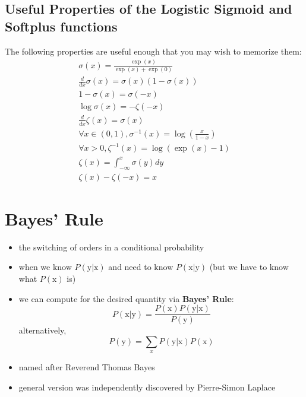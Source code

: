 \documentclass[11pt, twocolumn]{report}
\begin{document}
\subsection{Useful Properties of the Logistic Sigmoid and Softplus functions}
The following properties are useful enough that you may wish to memorize them:
\begin{align}
  \sigma(x) = \frac{\exp(x)}{\exp(x) + \exp(0)} \\
  \frac{d}{dx} \sigma(x) = \sigma(x)(1 - \sigma(x)) \\
  1 - \sigma(x) = \sigma(-x) \\
  \log \sigma(x) = -\zeta(-x) \\
  \frac{d}{dx} \zeta(x) = \sigma(x) \\
  \forall x \in (0, 1), \sigma^{-1}(x) = \log \left( \frac{x}{1 - x} \right) \\
  \forall x > 0, \zeta^{-1}(x) = \log(\exp(x) - 1) \\
  \zeta(x) = \int_{-\infty}^x \sigma(y)dy \\
  \zeta(x) - \zeta(-x) = x
\end{align}

\section{Bayes' Rule}
\begin{itemize}
  \item the switching of orders in a conditional probability
  \item when we know $P(\text{y} | \text{x})$ and need to know $P(\text{x} |
    \text{y})$ (but we have to know what $P(\text{x})$ is)
  \item we can compute for the desired quantity via \textbf{Bayes' Rule}:
    \begin{equation}
      P(\text{x} | \text{y}) = \frac{P(\text{x})P(\text{y} |
        \text{x})}{P(\text{y})}
    \end{equation}
    alternatively,
    \begin{equation}
      P(\text{y}) = \sum_x P(\text{y}|\text{x})P(\text{x})
    \end{equation}
  \item named after Reverend Thomas Bayes
  \item general version was independently discovered by Pierre-Simon Laplace
\end{itemize}
\end{document}
